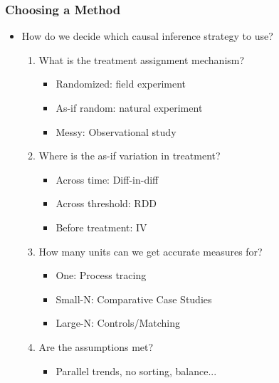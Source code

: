 \documentclass[xcolor=x11names,compress]{beamer}\usepackage[]{graphicx}\usepackage[]{color}
\renewcommand{\(}{\begin{columns}}
\renewcommand{\)}{\end{columns}}
\newcommand{\<}[1]{\begin{column}{#1}}
\renewcommand{\>}{\end{column}}
\begin{document}
\begin{frame}
\frametitle{Choosing a Method}
\begin{itemize}
\item How do we decide which causal inference strategy to use?
\pause
\begin{enumerate}
\item What is the treatment assignment mechanism?
\pause
\begin{itemize}
\item Randomized: field experiment
\item As-if random: natural experiment
\item Messy: Observational study
\pause
\end{itemize}
\item Where is the as-if variation in treatment?
\pause
\begin{itemize}
\item Across time: Diff-in-diff
\item Across threshold: RDD
\item Before treatment: IV 
\end{itemize}
\pause
\item How many units can we get accurate measures for?
\pause
\begin{itemize}
\item One: Process tracing
\item Small-N: Comparative Case Studies
\item Large-N: Controls/Matching
\end{itemize}
\pause
\item Are the assumptions met?
\pause
\begin{itemize}
\item Parallel trends, no sorting, balance...
\end{itemize}
\end{enumerate}
\end{itemize}
\end{frame}
\end{document}
